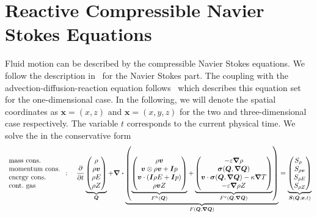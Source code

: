 \section{Reactive Compressible Navier Stokes Equations}\label{sec:navier-stokes}
\newcommand{\diffCoeff}{\varepsilon}
\newcommand{\hyperFluxDef}{
  \begin{pmatrix}
    \Qj \\
    \Qv  \otimes \Qj + \bm{I} \pressure  \\
    \Qv \cdot (\bm{I} \QE + \bm{I} \pressure) \\
    \Qj \QZZ
  \end{pmatrix}
}
\newcommand{\viscFluxDef}{
  \begin{pmatrix}
     -\diffCoeff \gradient{\Qrho}\\
     \stressT (\Q, \gradQ)  \\
     \Qv \cdot \stressT (\Q, \gradQ) - \kappa \gradient{T}\\
     -\diffCoeff \gradient{\QZ}
   \end{pmatrix}
}
Fluid motion can be described by the compressible Navier Stokes equations.
We follow the description in~\cite{dumbser2010arbitrary} for the Navier Stokes part.
The coupling with the advection-diffusion-reaction equation follows~\cite{hidalgo2011ader} which describes this equation set for the one-dimensional case.
In the following, we will denote the spatial coordinates as $\bm{x} = \left( x,z \right)$ and $\bm{x} = \left( x,y,z \right)$ for the two and three-dimensional case respectively.
The variable $t$ corresponds to the current physical time.
We solve the \pde{} in the conservative form%
\begin{equation}
 \label{eq:equation-set} 
 \begin{array}{l}
 \text{mass cons.} \\
 \text{momentum cons.} \\
 \text{energy cons.} \\
 \text{cont.\ gas} 
\end{array}
:
\quad
  \pdv{}{t}
  \underbrace{
  \begin{pmatrix}
    \Qrho\\
    \Qj\\
    \QE\\
    \QZ
    \end{pmatrix}}_{\Q}
  +
  \divergence{
  \underbrace{
  \left(
   \underbrace{\hyperFluxDef}_{\hyperFlux(\Q)}
+
\underbrace{\viscFluxDef}_{\viscFlux(\Q, \gradQ)}
  \right)}_{\flux(\Q, \gradQ)}}
 =
  \underbrace{
  \begin{pmatrix}
    \source[\Qrho\phantom{\Qrho}]\\
    \source[\Qj]\\
    \source[\QE]\\
    \source[\QZ]
    \end{pmatrix}}_{\source(\Q, \bm{x}, t)}
\end{equation}
